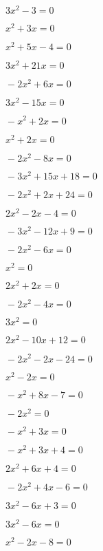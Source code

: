 \item
$\qquad
3x^2-3=0
$
\item
$\qquad
x^2+3x=0
$
\item
$\qquad
x^2+5x-4=0
$
\item
$\qquad
3x^2+21x=0
$
\item
$\qquad
-2x^2+6x=0
$
\item
$\qquad
3x^2-15x=0
$
\item
$\qquad
-x^2+2x=0
$
\item
$\qquad
x^2+2x=0
$
\item
$\qquad
-2x^2-8x=0
$
\item
$\qquad
-3x^2+15x+18=0
$
\item
$\qquad
-2x^2+2x+24=0
$
\item
$\qquad
2x^2-2x-4=0
$
\item
$\qquad
-3x^2-12x+9=0
$
\item
$\qquad
-2x^2-6x=0
$
\item
$\qquad
x^2=0
$
\item
$\qquad
2x^2+2x=0
$
\item
$\qquad
-2x^2-4x=0
$
\item
$\qquad
3x^2=0
$
\item
$\qquad
2x^2-10x+12=0
$
\item
$\qquad
-2x^2-2x-24=0
$
\item
$\qquad
x^2-2x=0
$
\item
$\qquad
-x^2+8x-7=0
$
\item
$\qquad
-2x^2=0
$
\item
$\qquad
-x^2+3x=0
$
\item
$\qquad
-x^2+3x+4=0
$
\item
$\qquad
2x^2+6x+4=0
$
\item
$\qquad
-2x^2+4x-6=0
$
\item
$\qquad
3x^2-6x+3=0
$
\item
$\qquad
3x^2-6x=0
$
\item
$\qquad
x^2-2x-8=0
$
